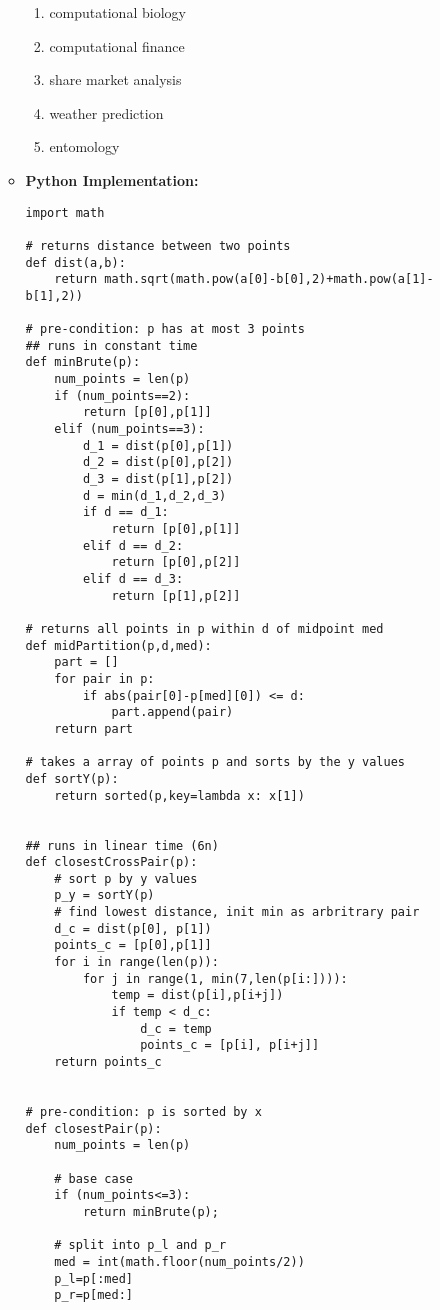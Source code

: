 \documentclass{article}
\begin{document}
\begin{enumerate}
\begin{itemize}
        \begin{enumerate}
            \item computational biology
            \item computational finance
            \item share market analysis
            \item weather prediction
            \item entomology
        \end{enumerate}
        \item \textbf{Python Implementation:}
        \begin{verbatim}
import math

# returns distance between two points
def dist(a,b):
    return math.sqrt(math.pow(a[0]-b[0],2)+math.pow(a[1]-b[1],2))

# pre-condition: p has at most 3 points
## runs in constant time
def minBrute(p):
    num_points = len(p)
    if (num_points==2):
        return [p[0],p[1]]
    elif (num_points==3):
        d_1 = dist(p[0],p[1])
        d_2 = dist(p[0],p[2])
        d_3 = dist(p[1],p[2])
        d = min(d_1,d_2,d_3)
        if d == d_1:
            return [p[0],p[1]]
        elif d == d_2:
            return [p[0],p[2]]
        elif d == d_3:
            return [p[1],p[2]]

# returns all points in p within d of midpoint med
def midPartition(p,d,med):
    part = []
    for pair in p:
        if abs(pair[0]-p[med][0]) <= d:
            part.append(pair)
    return part

# takes a array of points p and sorts by the y values
def sortY(p):
    return sorted(p,key=lambda x: x[1])


## runs in linear time (6n)
def closestCrossPair(p):
    # sort p by y values
    p_y = sortY(p)
    # find lowest distance, init min as arbritrary pair
    d_c = dist(p[0], p[1])
    points_c = [p[0],p[1]]
    for i in range(len(p)):
        for j in range(1, min(7,len(p[i:]))):
            temp = dist(p[i],p[i+j])
            if temp < d_c:
                d_c = temp
                points_c = [p[i], p[i+j]]
    return points_c


# pre-condition: p is sorted by x
def closestPair(p):
    num_points = len(p)

    # base case
    if (num_points<=3):
        return minBrute(p);

    # split into p_l and p_r
    med = int(math.floor(num_points/2))
    p_l=p[:med]
    p_r=p[med:]


\end{verbatim}
\end{itemize}
\end{enumerate}
\end{document}
